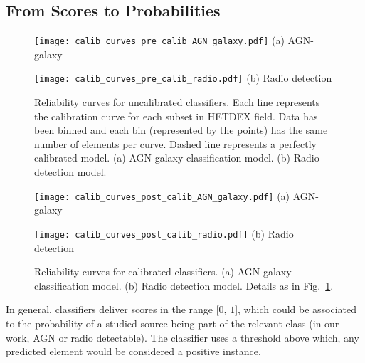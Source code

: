 \documentclass{aa}
\begin{document}
\begin{appendix}
\section{From Scores to Probabilities}\label{app:calibration_models}

\begin{figure}
  \centering
  \begin{minipage}{0.24\textwidth}
    \centering
    \texttt{[image: calib\_curves\_pre\_calib\_AGN\_galaxy.pdf]}\hfill\break%
    {(a) AGN-galaxy}
  \end{minipage}
  \hfill 
  \begin{minipage}{0.24\textwidth}
    \centering
    \texttt{[image: calib\_curves\_pre\_calib\_radio.pdf]}\hfill\break%
    {(b) Radio detection}
  \end{minipage}
  \caption{Reliability curves for uncalibrated classifiers. Each line represents the calibration curve for each subset in HETDEX field. Data has been binned and each bin (represented by the points) has the same number of elements per curve. Dashed line represents a perfectly calibrated model. (a) AGN-galaxy classification model. (b) Radio detection model.}
  \label{fig:calibration_curves_classification_pre}
\end{figure}

\begin{figure}
  \centering
  \begin{minipage}{0.24\textwidth}
    \centering
    \texttt{[image: calib\_curves\_post\_calib\_AGN\_galaxy.pdf]}\hfill\break%
    {(a) AGN-galaxy}
  \end{minipage}
  \hfill 
  \begin{minipage}{0.24\textwidth}
    \centering
    \texttt{[image: calib\_curves\_post\_calib\_radio.pdf]}\hfill\break%
    {(b) Radio detection}
  \end{minipage}
  \caption{Reliability curves for calibrated classifiers. (a) AGN-galaxy classification model. (b) Radio detection model. Details as in Fig.~\ref{fig:calibration_curves_classification_pre}.}
  \label{fig:calibration_curves_classification_post}
\end{figure}

In general, classifiers deliver scores in the range [$0$, $1$], which could be associated to the probability of a studied source being part of the relevant class (in our work, AGN or radio detectable). The classifier uses a threshold above which, any predicted element would be considered a positive instance. 


\end{appendix}
\end{document}
